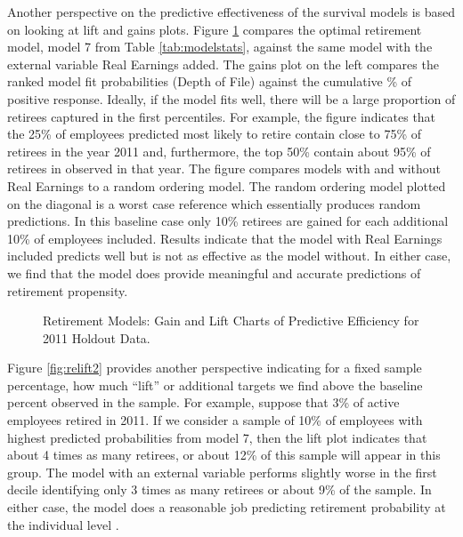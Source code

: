\documentclass[12pt,letterpaper]{article}
\begin{document}
Another perspective on the predictive effectiveness of the survival models is based on looking at lift and gains plots.  Figure \ref{fig:regainlift} compares the optimal retirement model, model 7 from Table \ref{tab:modelstats}, against the same model with the external variable Real Earnings added.  The gains plot on the left compares the ranked model fit probabilities (Depth of File) against the cumulative \% of positive response.  Ideally, if the model fits well, there will be a large proportion of retirees captured in the first percentiles. For example, the figure indicates that the 25\% of employees predicted most likely to retire contain close to 75\% of retirees in the year 2011 and, furthermore, the top 50\% contain about 95\% of retirees in observed in that year.  The figure compares models with and without Real Earnings to a random ordering model.  The random ordering model plotted on  the diagonal is a worst case reference which essentially produces random predictions.  In this baseline case only 10\% retirees are gained for each  additional 10\% of employees included.  Results indicate that the model with Real Earnings included predicts well but is not as effective as the model without.  In either case, we find that the model does provide meaningful and accurate predictions of retirement propensity.
\begin{figure}[h!]
	\centering
	\caption{Retirement Models: Gain and Lift Charts of Predictive Efficiency for 2011 Holdout Data.}
	\label{fig:regainlift}
\end{figure}
Figure \ref{fig:relift2} provides another perspective indicating for a fixed sample percentage, how much  \enquote{lift} or additional targets we find above the baseline percent observed in the sample. For example, suppose that 3\% of active employees retired in 2011. If we consider a sample of 10\% of employees with highest predicted probabilities from model 7, then the lift plot indicates that about 4 times as many retirees, or about 12\% of this sample will appear in this group. The model with an external variable performs slightly worse in the first decile identifying only 3 times as many retirees or about 9\% of the sample.  In either case, the model does a reasonable job predicting retirement probability at the individual level \citep{kuhn2013}.  %
\end{document}
